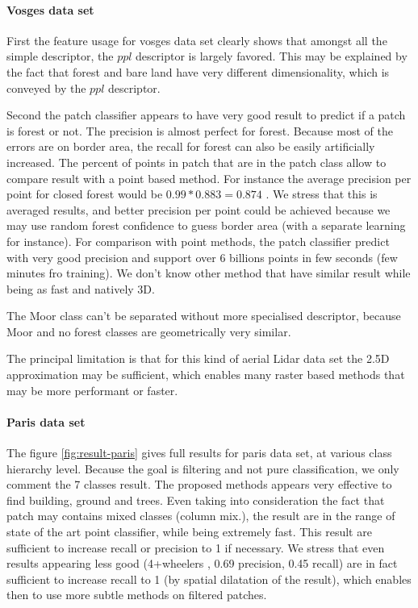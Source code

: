 			 \paragraph{Vosges data set}	
				 First the feature usage for vosges data set clearly shows that amongst all the simple descriptor, the $ppl$ descriptor is largely favored.
				 This may be explained by the fact that forest and bare land have very different dimensionality, which is conveyed by the $ppl$ descriptor.
				 
				 Second the patch classifier appears to have very good result to predict if a patch is forest or not. The precision is almost perfect for forest.
				 Because most of the errors are on border area, the recall for forest can also be easily artificially increased. The percent of points in patch that are in the patch class allow to compare result with a point based method. 
				 For instance the average precision per point for closed forest would be $0.99*0.883=0.874$ . We stress that this is averaged results, and better precision per point could be achieved because we may use random forest confidence to guess border area (with a separate learning for instance).
				 For comparison with point methods, the patch classifier predict with very good precision and support over 6 billions points in few seconds (few minutes fro training). We don't know other method that have similar result while being as fast and natively 3D.
				 
				 The Moor class can't be separated without more specialised descriptor, because Moor and no forest classes are geometrically very similar.
				  
				 The principal limitation is that for this kind of aerial Lidar data set the 2.5D approximation may be sufficient, which enables many raster based methods that may be more performant or faster.
				 
			 \paragraph{Paris data set}
				 The figure \ref{fig:result-paris} gives full results for paris data set, at various class hierarchy level.
				 Because the goal is filtering and not pure classification, we only comment the 7 classes result. The proposed methods appears very effective to find building, ground and trees.
				 Even taking into consideration the fact that patch may contains mixed classes (column mix.), the result are in the range of state of the art point classifier, while being extremely fast. 
				 This result are sufficient to increase recall or precision to 1 if necessary.
				 We stress that even results appearing less good (4+wheelers , 0.69 precision, 0.45 recall) are in fact sufficient to increase recall to 1 (by spatial dilatation of the result), which enables then to use more subtle methods on filtered patches.
				 
